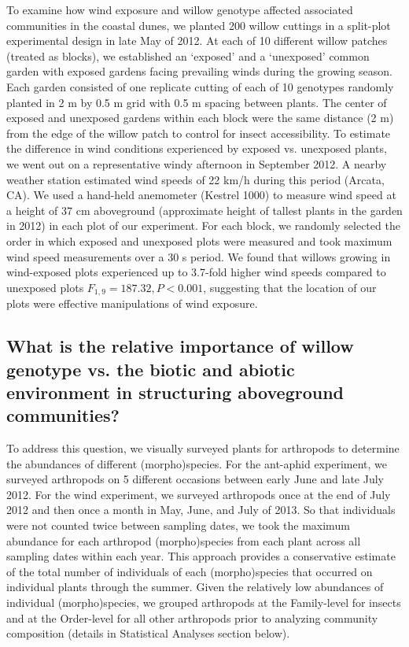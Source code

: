 \documentclass[11pt]{article}
\begin{document}
To examine how wind exposure and willow genotype affected associated
communities in the coastal dunes, we planted 200 willow cuttings in a
split-plot experimental design in late May of 2012. At each of 10
different willow patches (treated as blocks), we established an
`exposed' and a `unexposed' common garden with exposed gardens facing
prevailing winds during the growing season. Each garden consisted of one
replicate cutting of each of 10 genotypes randomly planted in 2 m by 0.5
m grid with 0.5 m spacing between plants. The center of exposed and
unexposed gardens within each block were the same distance (2 m) from
the edge of the willow patch to control for insect accessibility. To
estimate the difference in wind conditions experienced by exposed vs.
unexposed plants, we went out on a representative windy afternoon in
September 2012. A nearby weather station estimated wind speeds of 22
km/h during this period (Arcata, CA). We used a hand-held anemometer
(Kestrel 1000) to measure wind speed at a height of 37 cm aboveground
(approximate height of tallest plants in the garden in 2012) in each
plot of our experiment. For each block, we randomly selected the order
in which exposed and unexposed plots were measured and took maximum wind
speed measurements over a 30 s period. We found that willows growing in
wind-exposed plots experienced up to 3.7-fold higher wind speeds
compared to unexposed plots \(F_{1,9}=187.32,P<0.001\), suggesting that the
location of our plots were effective manipulations of wind exposure.


\subsection*{What is the relative importance of willow genotype vs. the
biotic and abiotic environment in structuring aboveground
communities?}

To address this question, we visually surveyed plants for arthropods to
determine the abundances of different (morpho)species. For the ant-aphid
experiment, we surveyed arthropods on 5 different occasions between
early June and late July 2012. For the wind experiment, we surveyed
arthropods once at the end of July 2012 and then once a month in May,
June, and July of 2013. So that individuals were not counted twice
between sampling dates, we took the maximum abundance for each arthropod
(morpho)species from each plant across all sampling dates within each
year. This approach provides a conservative estimate of the total number
of individuals of each (morpho)species that occurred on individual
plants through the summer. Given the relatively low abundances of
individual (morpho)species, we grouped arthropods at the Family-level
for insects and at the Order-level for all other arthropods prior to
analyzing community composition (details in Statistical Analyses section
below).
\end{document}
